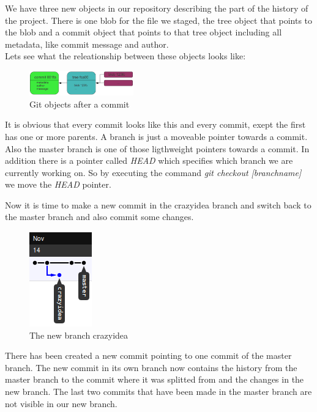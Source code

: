 We have three new objects in our repository describing the part of the history
of the project. There is one blob for the file we staged, the tree object that
points to the blob and a commit object that points to that tree object including
all metadata, like commit message and author. 
\\

Lets see what the releationship between these objects looks like:

\begin{figure}[h]
  \includegraphics[width=0.4\textwidth]{img/branch2}
  \caption{Git objects after a commit}
  \label{fig: git objects after a commit}
\end{figure}

It is obvious that every commit looks like this and every commit, exept the first
has one or more parents.
A branch is just a moveable pointer towards a commit. Also the master branch is
one of those ligthweight pointers towards a commit. In addition there is a
pointer called \emph{HEAD} which specifies which branch we are currently working on. So by
executing the command \emph{git checkout [branchname]} we move the \emph{HEAD}
pointer. 

Now it is time to make a new commit in the crazyidea branch and switch back to
the master branch and also commit some changes.

\begin{figure}[h]
  \centering
  \includegraphics{img/branch3}
  \caption{The new branch crazyidea}
  \label{fig: a new branch}
\end{figure}

There has been created a new commit pointing to one commit of the master branch.
The new commit in its own branch now contains the history from the master branch
to the commit where it was splitted from and the changes in the new
branch. The last two commits that have been made in the master branch are not
visible in our new branch. 

